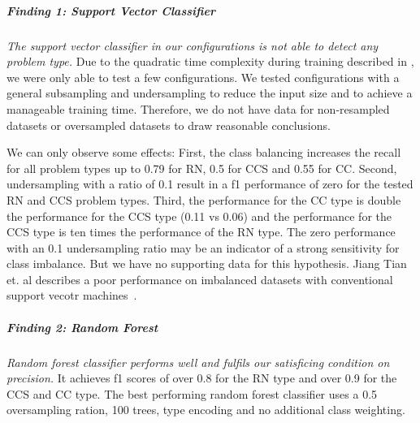 \subparagraph{Finding 1: Support Vector Classifier} 
\textit{The support vector classifier in our configurations is not able to detect any problem type.}
Due to the quadratic time complexity during training described in , we were only able to test a few configurations. We tested configurations with a general subsampling and undersampling to reduce the input size and to achieve a manageable training time. Therefore, we do not have data for non-resampled datasets or oversampled datasets to draw reasonable conclusions.

We can only observe some effects:
First, the class balancing increases the recall for all problem types up to 0.79 for RN, 0.5 for CCS and 0.55 for CC. Second, undersampling with a ratio of 0.1 result in a f1 performance of zero for the tested RN and CCS problem types. Third, the performance for the CC type is double the performance for the CCS type (0.11 vs 0.06) and the performance for the CCS type is ten times the performance of the RN type. 
The zero performance with an 0.1 undersampling ratio may be an indicator of a strong sensitivity for class imbalance. But we have no supporting data for this hypothesis. Jiang Tian et. al describes a poor performance on imbalanced datasets with conventional support vecotr machines~\cite{tian_imbalanced_2011}.

\begin{center}
\end{center}


\subparagraph{Finding 2: Random Forest}
\textit{Random forest classifier performs well and fulfils our satisficing condition on precision.} It achieves f1 scores of over 0.8 for the RN type and over 0.9 for the CCS and CC type.
The best performing random forest classifier uses a 0.5 oversampling ration, 100 trees, type encoding and no additional class weighting.


